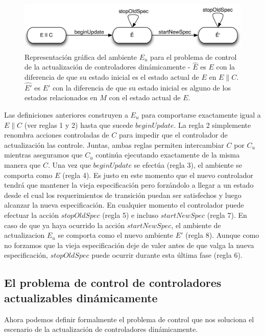 \begin{figure}
\centering
\includegraphics[scale=0.35]{img/E_u.png}
\caption{Representación gráfica del ambiente $E_u$ para el problema de control de la actualización de controladores
dinámicamente - $\hat{E}$ es $E$ con la diferencia de que su estado inicial es el estado actual de $E$ en $E\|C$.
$\hat{E'}$ es $E'$ con la diferencia de que su estado inicial es alguno de los estados relacionados en $M$ con el estado
actual de $E$.}
\label{update_environment}
\end{figure}

Las definiciones anteriores construyen a $E_u$ para comportarse exactamente igual a $E\|C$ (ver reglas 1 y 2) hasta que
sucede $beginUpdate$. La regla 2 simplemente renombra acciones controladas de $C$ para impedir que el controlador de
actualización las controle. Juntas, ambas reglas permiten intercambiar $C$ por $C_u$ mientras aseguramos que $C_u$
continúa ejecutando exactamente de la misma manera que $C$. Una vez que $beginUpdate$ se efectúa (regla 3), el ambiente
se comporta como $E$ (regla 4). Es justo en este momento que el nuevo controlador tendrá que mantener la vieja
especificación pero forzándolo a llegar a un estado desde el cual los requerimientos de transición puedan ser
satisfechos y luego alcanzar la nueva especificación. En cualquier momento el controlador puede efectuar la acción
$stopOldSpec$ (regla 5) e incluso $startNewSpec$ (regla 7). En caso de que ya haya ocurrido la acción $startNewSpec$, el
ambiente de actualizacion $E_u$ se comporta como el nuevo ambiente $E'$ (regla 8). Aunque como no forzamos que la
vieja especificación deje de valer antes de que valga la nueva especificación, $stopOldSpec$ puede ocurrir durante esta
última fase (regla 6).

\subsection{El problema de control de controladores actualizables dinámicamente}

Ahora podemos definir formalmente el problema de control que nos soluciona el escenario de la actualización de
controladores dinámicamente.

